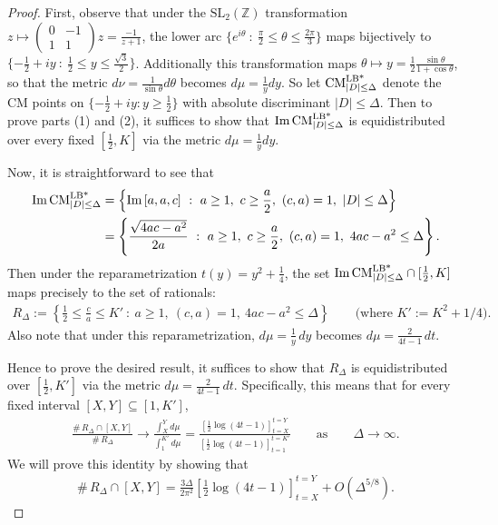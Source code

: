 \documentclass[11pt,letterpaper,reqno]{amsart}
\numberwithin{equation}{section}
\numberwithin{figure}{section}
\numberwithin{table}{section}
\newcommand{\lrp}[1]{\left(#1\right)}
\newcommand{\lrb}[1]{\left[#1\right]}
\newcommand{\lrcb}[1]{\left\{#1\right\}}
\newcommand{\pttmatrix}[4]{
\left(
\begin{smallmatrix}
  #1 & #2 \\
  #3 & #4
\end{smallmatrix}
\right)
}
\newcommand{\ZZ}{\mathbb{Z}}
\newcommand{\SL}{\text{SL}}
\newcommand{\CM}{\textnormal{CM}}
\begin{document}
\begin{proof}
    First, observe that under the $\SL_2(\ZZ)$ transformation $z \mapsto \pttmatrix{0}{-1}{1}{1}z = \frac{-1}{z+1}$, the lower arc $\{e^{i\theta} \ :\ \frac{\pi}{2} \le \theta \le \frac{2\pi}{3} \}$ maps bijectively to $\{-\frac{1}{2} + iy \ :\ \frac12  \le y \le \frac{\sqrt{3}}{2}\}$. Additionally this transformation maps $\theta \mapsto y = \frac 12 \frac{\sin \theta}{1+\cos \theta}$, so that the metric $d\nu = \frac{1}{\sin \theta} d\theta$ becomes $d\mu = \frac{1}{y}dy$. So let $\CM^\textnormal{LB*}_{|D| \le \Delta}$ denote the CM points on $\{-\frac{1}{2} + i y : y \ge \frac12\}$ with absolute discriminant $|D| \le \Delta$.
    Then to prove parts (1) and (2), it suffices to show that
    $\textnormal{Im\,} \CM^\textnormal{LB*}_{|D|\le \Delta}$ is equidistributed over every fixed $[\frac{1}{2}, K]$ via the metric $d\mu = \frac{1}{y}dy$.

    Now, it is straightforward to see that
    \begin{align}
        \textnormal{Im\,}\CM^\textnormal{LB*}_{|D|\le \Delta} 
        &= \lrcb{ \textnormal{Im\,} [a,a,c] ~:~ a \ge 1,~ c \ge \frac{a}{2},~ (c,a)=1,~ |D| \le \Delta } \\
        &= \lrcb{ \frac{\sqrt{4ac-a^2}}{2a} ~:~ a \ge 1,~ c \ge \frac{a}{2},~ (c,a)=1,~ 4ac-a^2 \le \Delta }. 
    \end{align}
    Then under the reparametrization $t(y) = y^2+\frac14$, the set $\textnormal{Im\,}\CM^\textnormal{LB*}_{|D|\le \Delta} \cap [\frac{1}{2}, K]$ maps precisely to the set of rationals:
    \begin{align}
        R_{\Delta} := \lrcb{\frac12 \le \frac{c}{a} \le K' ~:~ a\ge 1,~(c,a)=1, ~4ac-a^2 \le \Delta} \qquad\text{(where $K':=K^2+1/4$)}.
    \end{align} 
    Also note that under this reparametrization, $d\mu = \frac{1}{y}\,dy$ becomes $d\mu = \frac{2}{4t-1} \,dt$.
    
    Hence to prove the desired result, it suffices to show that $R_{\Delta}$ is equidistributed over $[\frac12,K']$ via the metric $d\mu = \frac{2}{4t-1} \,dt$.  
    Specifically, this means that for every fixed interval $[X,Y] \subseteq [1,K']$,
    \begin{align}
        \frac{\#\, R_{\Delta} \cap [X,Y]}{\#\,R_{\Delta}} \longrightarrow \frac{\int_X^Y d\mu}{\int_1^{K'} d\mu} = 
        \frac{
            \lrb{\frac{1}{2} \log(4t-1)}_{t=X}^{t=Y} 
        }{
            \lrb{\frac{1}{2} \log(4t-1)}_{t=1}^{t=K'}
        } \qquad \text{as} \qquad \Delta\to\infty.
    \end{align} 
    We will prove this identity by showing that
    \begin{align} \label{eqn:goal-temp1} \tag{$*$}
        \#\, R_{\Delta} \cap [X,Y] = \frac{3\Delta}{2\pi^2} \lrb{\frac12\log(4t-1)}_{t=X}^{t=Y} + O\lrp{\Delta^{5/8}}.
    \end{align}
    

\end{proof}
\end{document}
